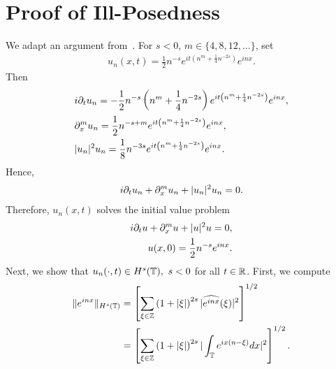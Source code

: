 \section{Proof of Ill-Posedness}
We adapt an argument from~\cite{Burq:2002xd}. For $s<0$,
$m \in \{4, 8, 12, \dots\}$, set
%
%
%
%
\begin{equation}
	\label{nill-soln}
	\begin{split}
		u_{n}(x,t)=\frac{1}{2 }n^{-s}e^{it\left( n^{m}+\frac{1}{4}n^{-2s}
		\right)}e^{inx}.
	\end{split}
\end{equation}
%
%
Then
%
%
\begin{equation*}
	\begin{split}
		& i \partial_t u_{n}
		= -\frac{1}{2 }n^{-s}\left( n^{m}+\frac{1}{4}n^{-2s} \right)e^{it\left(
		n^{m}+ \frac{1}{4}n^{-2s} \right)}e^{inx},
		\\
		& \partial_x^{m}u_{n}  = \frac{1}{2 }n^{-s+m}e^{it\left(
		n^{m}+\frac{1}{4}n^{-2s} \right)}e^{inx},
		\\
		& | u_{n} |^{2}u_{n}  = \frac{1}{8 }n^{-3s}e^{it\left(
		n^{m}+\frac{1}{4}n^{-2s} \right)}e^{inx}.
	\end{split}
\end{equation*}
%
%
Hence,
%
%
\begin{equation*}
	\begin{split}
		i \partial_t u_{n} + \partial_x^{m}u_{n} + | u_{n} |^{2} u_{n}
		=0.
	\end{split}
\end{equation*}
%
%
Therefore, $u_{n}(x,t)$ solves the initial value problem
%
%
\begin{gather*}
	\begin{split}
		i \partial_t u + \partial_x^m u + | u |^{2}u = 0,
		\\
    u(x,0) = \frac{1}{2 }n^{-s}e^{inx}.
	\end{split}
\end{gather*}
%
%
Next, we show that $u_{n}(\cdot, t) \in H^{s}(\mathbb{T}), \text{ } s < 0$ for all $t
\in \mathbb{R}$.  First, we compute
%
%
\begin{equation*}
	\begin{split}
		\|e^{inx}\|_{H^{s}(\mathbb{T})}
		& =  \left[ \sum_{\xi \in \mathbb{Z}} \left( 1+ | \xi |
		\right)^{2s} | \widehat{e^{inx}}(\xi) |^{2} \right]^{1/2}
		\\
		& =  \left[ \sum_{\xi \in \mathbb{Z}} \left( 1 + | \xi | \right)^{2s} |
		\int_{\mathbb{T}}e^{ix(n- \xi)}dx |^{2}\right]^{1/2}.
	\end{split}
\end{equation*}

